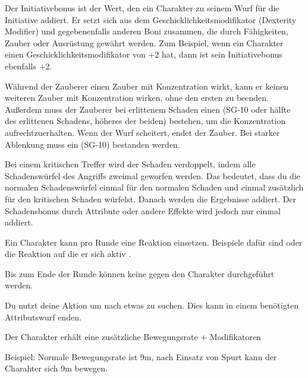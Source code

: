 Der Initiativebonus ist der Wert, den ein Charakter zu seinem Wurf für die Initiative addiert. Er setzt sich aus dem Geschicklichkeitsmodifikator (Dexterity Modifier) und gegebenenfalls anderen Boni zusammen, die durch Fähigkeiten, Zauber oder Ausrüstung gewährt werden. Zum Beispiel, wenn ein Charakter einen Geschicklichkeitsmodifikator von +2 hat, dann ist sein Initiativebonus ebenfalls +2.



Während der Zauberer einen Zauber mit Konzentration wirkt, kann er keinen weiteren Zauber mit Konzentration wirken, ohne den ersten zu beenden. Außerdem muss der Zauberer bei erlittenem Schaden einen  (SG-10 oder hälfte des erlittenen Schadens, höheres der beiden) bestehen, um die Konzentration aufrechtzuerhalten. Wenn der Wurf scheitert, endet der Zauber. Bei starker Ablenkung muss ein  (SG-10) bestanden werden.



Bei einem kritischen Treffer wird der Schaden verdoppelt, indem alle Schadenswürfel des Angriffs zweimal geworfen werden. Das bedeutet, dass du die normalen Schadenswürfel einmal für den normalen Schaden und einmal zusätzlich für den kritischen Schaden würfelst. Danach werden die Ergebnisse addiert. Der Schadensbonus durch Attribute oder andere Effekte wird jedoch nur einmal addiert.



Ein Charakter kann pro Runde eine Reaktion einsetzen. Beispiele dafür sind  oder die Reaktion auf die er sich aktiv .



Bis zum Ende der Runde können keine  gegen den Charakter durchgeführt werden.



Du nutzt deine Aktion um nach etwas zu suchen. Dies kann in einem benötigten Attributswurf enden.



Der Charakter erhält eine zusätzliche Bewegungsrate + Modifikatoren

Beispiel: Normale Bewegungsrate ist 9m, nach Einsatz von Spurt kann der Charahter sich 9m bewegen.



